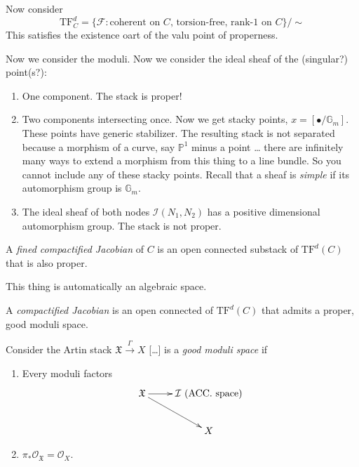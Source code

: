 \medskip\noindent
Now consider
$$
\text{TF}_C^d=\{\mathcal{F}:
\text{coherent on $C$, torsion-free, rank-1
on $C$}\}/\sim
$$
This satisfies the existence oart of the valu
point of properness.

Now we consider the moduli. Now we consider
the ideal sheaf of the (singular?)
point(s?):
\begin{enumerate}
\item One component. The stack is proper!
\item Two components intersecting once. Now
we get stacky points,
$x=[\bullet/\mathbb{G}_m]$. These points have
generic stabilizer. The resulting
stack is not separated because a morphism of
a curve, say $\mathbb{P}^1$ minus a
point … there are infinitely many ways to
extend a morphism from this thing to a
line bundle. So you cannot include any of
these stacky points. Recall that a
sheaf is {\it simple} if its automorphism
group is $\mathbb{G}_m$.
\item  The ideal sheaf of both nodes
$\mathcal{I}(N_1,N_2)$ has a positive
dimensional automorphism
group. The stack is not proper.
\end{enumerate}

\begin{definition}
\label{definition-fine-compactified-Jacobian}
A {\it fined compactified Jacobian} of $C$ is
an open connected substack of
$\text{TF}^d(C)$ that is also proper.
\end{definition}

\begin{remark}
\label{remark-algebraic-space}
This thing is automatically an algebraic
space.
\end{remark}

\begin{definition}
\label{definition-compactified-Jacobian}
A {\it compactified Jacobian} is an open
connected of $\text{TF}^d(C)$ that
admits a proper, good moduli space.
\end{definition}

Consider the Artin stack $\mathfrak{X}
\xrightarrow{\Gamma}X$ […]
 is a {\it good
moduli space} if
\begin{enumerate}
\item Every moduli factors
$$
\xymatrix{
\mathfrak{X} \ar[r]\ar[rd]&\mathcal{I}\text{
(ACC. space)}\\
& X
}
$$
\item
$\pi_*\mathcal{O}_{\mathfrak{X}}=\mathcal{O}
_X$.
\end{enumerate}


